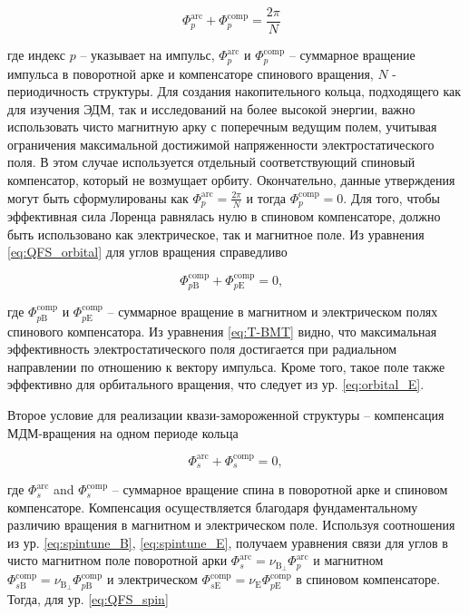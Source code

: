 \begin{equation}
	\Phi_p^{\textrm{arc}}+\Phi_{p}^{\textrm{comp}}=\frac{2\pi}{N}\ \ \
	\label{eq:QFS_orbital}
\end{equation}

\noindent где индекс $p$ -- указывает на импульс, $\Phi_p^{\textrm{arc}}$ и $\Phi_{p}^{\textrm{comp}}$ -- суммарное вращение импульса в поворотной арке и компенсаторе спинового вращения, $N$ - периодичность структуры. Для создания накопительного кольца, подходящего как для изучения ЭДМ, так и исследований на более высокой энергии, важно использовать чисто магнитную арку с поперечным ведущим полем, учитывая ограничения максимальной достижимой напряженности электростатического поля. В этом случае используется отдельный соответствующий спиновый компенсатор, который не возмущает орбиту. Окончательно, данные утверждения могут быть сформулированы как $\Phi_p^{\textrm{arc}} = \frac{2\pi}{N}$ и тогда $\Phi_{p}^{\textrm{comp}} = 0$. Для того, чтобы эффективная сила Лоренца равнялась нулю в спиновом компенсаторе, должно быть использовано как электрическое, так и магнитное поле. Из уравнения \ref{eq:QFS_orbital} для углов вращения справедливо

\begin{equation}
	\Phi_{p\textrm{B}}^{\textrm{comp}}+{\Phi}_{p\textrm{E}}^{\textrm{comp}} = 0,\ \ \,
	\label{eq:spin_comp}
\end{equation}

\noindent где $\Phi_{p\textrm{B}}^{\textrm{comp}}$ и ${\Phi}_{p\textrm{E}}^{\textrm{comp}}$ -- суммарное вращение в магнитном и электрическом полях спинового компенсатора. Из уравнения \ref{eq:T-BMT} видно, что максимальная эффективность электростатического поля достигается при радиальном направлении по отношению к вектору импульса. Кроме того, такое поле также эффективно для орбитального вращения, что следует из ур. \ref{eq:orbital_E}.

Второе условие для реализации квази-замороженной структуры -- компенсация МДМ-вращения на одном периоде кольца

\begin{equation}
	\Phi_s^{\textrm{arc}}+\Phi_{s}^{\textrm{comp}}=0,
	\label{eq:QFS_spin}
\end{equation}

\noindent где $\Phi_s^{\textrm{arc}}$ and $\Phi_{s}^{\textrm{comp}}$ -- суммарное вращение спина в поворотной арке и спиновом компенсаторе. Компенсация осуществляется благодаря фундаментальному различию вращения в магнитном и электрическом поле. Используя соотношения из ур. \ref{eq:spintune_B}, \ref{eq:spintune_E}, получаем уравнения связи для углов в чисто магнитном поле поворотной арки  $\Phi_{s}^{\text{arc}} = \nu_{\mathrm{B}_{\perp}}\Phi_{p}^{\text{arc}}$ и магнитном $\Phi_{s\mathrm{B}}^{\text{comp}} = \nu_{\mathrm{B}_{\perp}}\Phi_{p\mathrm{B}}^{\text{comp}}$ и электрическом $\Phi_{s\mathrm{E}}^{\text{comp}} = \nu_{\mathrm{E}}\Phi_{p\mathrm{E}}^{\text{comp}}$ в спиновом компенсаторе. Тогда, для ур. \ref{eq:QFS_spin}

